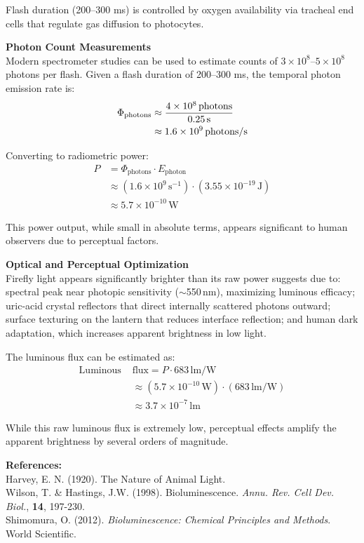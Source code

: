 \begin{technical}
Flash duration (200–300 ms) is controlled by oxygen availability via tracheal end cells that regulate gas diffusion to photocytes.

\noindent\textbf{Photon Count Measurements}\\
Modern spectrometer studies can be used to estimate counts of 
$3 \times 10^8$–$5 \times 10^8$ photons per flash. Given a flash duration of 200–300 ms, the temporal photon emission rate is:
\begin{align*}
\Phi_{\text{photons}} &\approx 
\frac{4 \times 10^8\,\text{photons}}{0.25\,\text{s}} \notag\\
&\approx 1.6 \times 10^9\,\text{photons/s}
\end{align*}

Converting to radiometric power:
\begin{align*}
P &= \Phi_{\text{photons}} \cdot E_{\text{photon}} \\
  &\approx (1.6 \times 10^9\,\text{s}^{-1}) \cdot (3.55 \times 10^{-19}\,\text{J}) \\
  &\approx 5.7 \times 10^{-10}\,\text{W}
\end{align*}

This power output, while small in absolute terms, appears significant to human observers due to perceptual factors.
\vspace{0.5em}

\noindent\textbf{Optical and Perceptual Optimization}\\
Firefly light appears significantly brighter than its raw power suggests due to: spectral peak near photopic sensitivity ($\sim$550$\,\text{nm}$), maximizing luminous efficacy; uric-acid crystal reflectors that direct internally scattered photons outward; surface texturing on the lantern that reduces interface reflection; and human dark adaptation, which increases apparent brightness in low light.

The luminous flux can be estimated as:
\begin{align*}
\text{Luminous }&\text{flux} = P \cdot 683\,\text{lm/W} \\
&\approx (5.7 \times 10^{-10}\,\text{W}) \cdot (683\,\text{lm/W}) \\
&\approx 3.7 \times 10^{-7}\,\text{lm}
\end{align*}

While this raw luminous flux is extremely low, perceptual effects amplify the apparent brightness by several orders of magnitude. 

\vspace{0.5em}
\noindent\textbf{References:}\\
{\footnotesize
Harvey, E. N. (1920). The Nature of Animal Light.\\
Wilson, T. \& Hastings, J.W. (1998). Bioluminescence. \textit{Annu. Rev. Cell Dev. Biol.}, \textbf{14}, 197-230.\\
Shimomura, O. (2012). \textit{Bioluminescence: Chemical Principles and Methods}. World Scientific.\\
}
\end{technical}